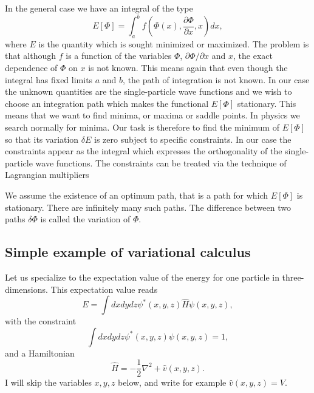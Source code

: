In the general case we have an integral of the type
\[ E[\Phi]= \int_a^b f(\Phi(x),\frac{\partial \Phi}{\partial x},x)dx,\]
where $E$ is the quantity which is sought minimized or maximized.  The
problem is that although $f$ is a function of the variables $\Phi$,
$\partial \Phi/\partial x$ and $x$, the exact dependence of $\Phi$ on
$x$ is not known.  This means again that even though the integral has
fixed limits $a$ and $b$, the path of integration is not known. In our
case the unknown quantities are the single-particle wave functions and
we wish to choose an integration path which makes the functional
$E[\Phi]$ stationary. This means that we want to find minima, or
maxima or saddle points. In physics we search normally for minima.
Our task is therefore to find the minimum of $E[\Phi]$ so that its
variation $\delta E$ is zero subject to specific constraints. In our
case the constraints appear as the integral which expresses the
orthogonality of the single-particle wave functions.  The constraints
can be treated via the technique of Lagrangian multipliers

We assume the existence of an optimum path, that is a path for which
$E[\Phi]$ is stationary. There are infinitely many such paths.  The
difference between two paths $\delta\Phi$ is called the variation of
$\Phi$.
\subsection{Simple example of variational calculus}
Let us specialize to the expectation value of the energy for one
particle in three-dimensions.  This expectation value reads
\[
  E=\int dxdydz \psi^*(x,y,z) \hat{H} \psi(x,y,z),
\]
with the constraint
\[
 \int dxdydz \psi^*(x,y,z) \psi(x,y,z)=1,
\]
and a Hamiltonian
\[
\hat{H}=-\frac{1}{2}\nabla^2+\hat{v}(x,y,z).
\]
I will skip the variables $x,y,z$ below, and write for example
$\hat{v}(x,y,z)=V$.

